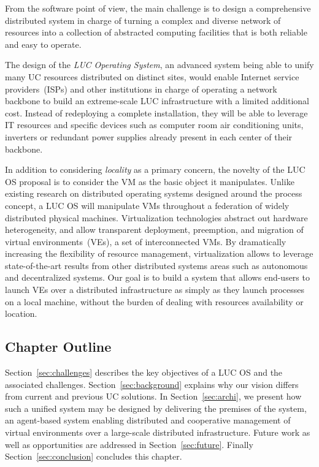From the software point of view, the main challenge is to design a comprehensive distributed
system in charge of turning a complex and diverse network of resources into a collection
of abstracted computing facilities that is both reliable and easy to operate.

\begin{svgraybox}
  The design of the \emph{LUC  Operating System},  an advanced system being able to unify many UC
  resources distributed on distinct sites,  would enable Internet service providers~(ISPs)
  and other institutions in charge of operating a network backbone to build an
  extreme-scale LUC infrastructure with a limited additional cost. Instead of redeploying
  a complete installation, they will be able to leverage IT resources and specific devices
  such as computer room air conditioning units, inverters or redundant power supplies
  already present in each center of their backbone.
\end{svgraybox}


\medskip

In addition to considering \emph{locality} as a primary concern, the novelty of the LUC OS
proposal is to consider the VM as the basic object it manipulates.  Unlike existing
research on distributed operating systems designed around the process concept, a LUC OS
will manipulate VMs throughout a federation of widely distributed physical
machines. Virtualization technologies abstract out hardware heterogeneity, and allow
transparent deployment, preemption, and migration of virtual environments~(VEs), \ie a set
of interconnected VMs.  By dramatically increasing the flexibility of resource management,
virtualization allows to leverage state-of-the-art results from other distributed systems
areas such as autonomous and decentralized systems.  Our goal is to build a system that
allows end-users to launch VEs over a distributed infrastructure as simply as they launch
processes on a local machine, \ie without the burden of dealing with resources
availability or location.

\subsection{Chapter Outline} 
Section~\ref{sec:challenges} describes the key objectives of a LUC OS and the associated
challenges.  Section~\ref{sec:background} explains why our vision differs from current and
previous UC solutions. In Section~\ref{sec:archi}, we present how such a unified system
may be designed by delivering the premises of the \discovery system, an agent-based system
enabling distributed and cooperative management of virtual environments over a large-scale
distributed infrastructure.  Future work as well as opportunities are addressed in
Section~\ref{sec:future}. Finally Section~\ref{sec:conclusion} concludes this chapter.
